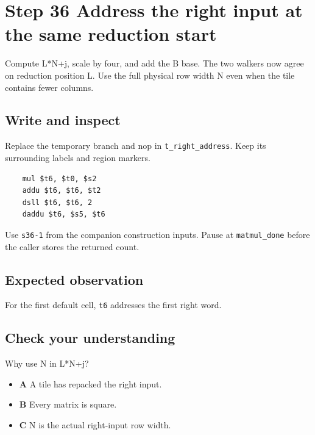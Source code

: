 \section{Step 36 Address the right input at the same reduction start}\label{matmul-s36}

Compute L*N+j, scale by four, and add the B base. The two walkers now agree on reduction position L. Use the full physical row width N even when the tile contains fewer columns.

\subsection{Write and inspect}
Replace the temporary branch and nop in \texttt{t\_right\_address}. Keep its surrounding labels and region markers.

\begin{verbatim}
    mul $t6, $t0, $s2
    addu $t6, $t6, $t2
    dsll $t6, $t6, 2
    daddu $t6, $s5, $t6
\end{verbatim}
Use \texttt{s36-1} from the companion construction inputs. Pause at \texttt{matmul\_done} before the caller stores the returned count.

\subsection{Expected observation}
For the first default cell, \texttt{t6} addresses the first right word.

\subsection{Check your understanding}
Why use N in L*N+j?

\begin{itemize}
  \item \textbf{A} A tile has repacked the right input.
  \item \textbf{B} Every matrix is square.
  \item \textbf{C} N is the actual right-input row width.
\end{itemize}
